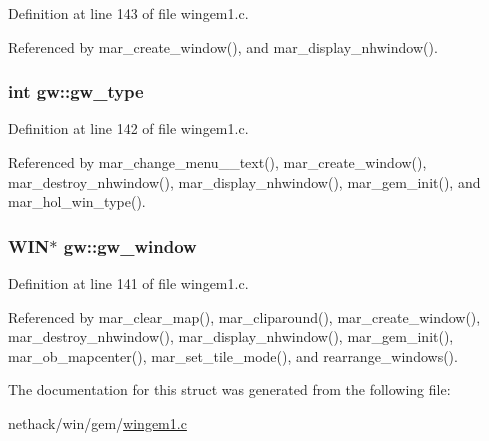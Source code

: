Definition at line 143 of file wingem1.\+c.



Referenced by mar\+\_\+create\+\_\+window(), and mar\+\_\+display\+\_\+nhwindow().

\hypertarget{structgw_a2d83ece04b7783bc08bea9820c972913}{
\subsubsection[{gw\+\_\+type}]{\setlength{\rightskip}{0pt plus 5cm}int gw\+::gw\+\_\+type}}\label{structgw_a2d83ece04b7783bc08bea9820c972913}


Definition at line 142 of file wingem1.\+c.



Referenced by mar\+\_\+change\+\_\+menu\+\_\+\_\+text(), mar\+\_\+create\+\_\+window(), mar\+\_\+destroy\+\_\+nhwindow(), mar\+\_\+display\+\_\+nhwindow(), mar\+\_\+gem\+\_\+init(), and mar\+\_\+hol\+\_\+win\+\_\+type().

\hypertarget{structgw_ad6e5411019a4cfd1490cdd1e6f349d22}{
\subsubsection[{gw\+\_\+window}]{\setlength{\rightskip}{0pt plus 5cm}W\+I\+N$\ast$ gw\+::gw\+\_\+window}}\label{structgw_ad6e5411019a4cfd1490cdd1e6f349d22}


Definition at line 141 of file wingem1.\+c.



Referenced by mar\+\_\+clear\+\_\+map(), mar\+\_\+cliparound(), mar\+\_\+create\+\_\+window(), mar\+\_\+destroy\+\_\+nhwindow(), mar\+\_\+display\+\_\+nhwindow(), mar\+\_\+gem\+\_\+init(), mar\+\_\+ob\+\_\+mapcenter(), mar\+\_\+set\+\_\+tile\+\_\+mode(), and rearrange\+\_\+windows().



The documentation for this struct was generated from the following file\+:\begin{DoxyCompactItemize}
\item 
nethack/win/gem/\hyperlink{wingem1_8c}{wingem1.\+c}\end{DoxyCompactItemize}
